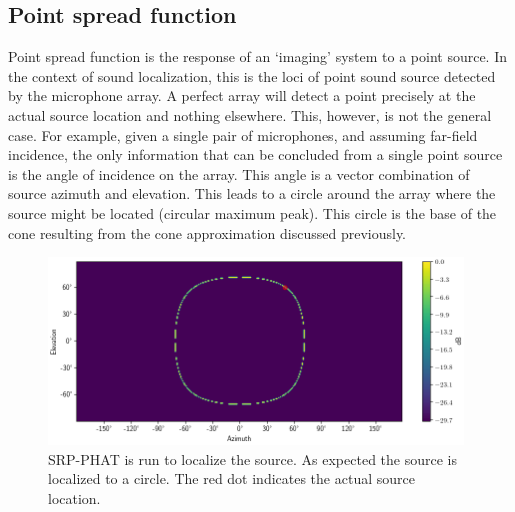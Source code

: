 \subsection{Point spread function}
Point spread function is the response of an `imaging' system to a point source. In the context of sound localization, this is the loci of point sound source detected by the microphone array. A perfect array will detect a point precisely at the actual source location and nothing elsewhere. This, however, is not the general case. For example, given a single pair of microphones, and assuming far-field incidence, the only information that can be concluded from a single point source is the angle of incidence on the array. This angle is a vector combination of source azimuth and elevation. This leads to a circle around the array where the source might be located (circular maximum peak). This circle is the base of the cone resulting from the cone approximation discussed previously.


\begin{figure}[H]
    \centering
    \includegraphics[width=0.98\textwidth]{Figures/2mic1srcRes.png}
    \caption{SRP-PHAT is run to localize the source. As expected the source is localized to a circle. The red dot indicates the actual source location.}
    \label{fig:2mic1src}
\end{figure}

